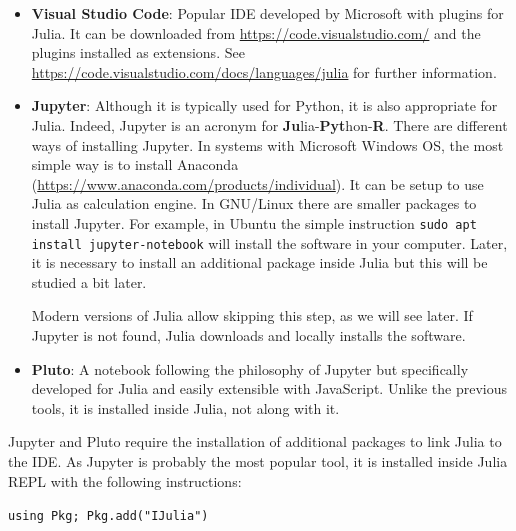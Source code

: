 \begin{itemize}
	\item \textbf{Visual Studio Code}: Popular IDE developed by Microsoft with plugins for Julia. It can be downloaded from \href{https://code.visualstudio.com/}{https://code.visualstudio.com/} and the plugins installed as extensions. See \href{https://code.visualstudio.com/docs/languages/julia}{https://code.visualstudio.com/docs/languages/julia} for further information.
	\item \textbf{Jupyter}: Although it is typically used for Python, it is also appropriate for Julia. Indeed, Jupyter is an acronym for \textbf{Ju}lia-\textbf{Pyt}hon-\textbf{R}. There are different ways of installing Jupyter. In systems with Microsoft Windows OS, the most simple way is to install Anaconda (\href{https://www.anaconda.com/products/individual}{https://www.anaconda.com/products/individual}). It can be setup to use Julia as calculation engine. In GNU/Linux there are smaller packages to install Jupyter. For example, in Ubuntu the simple instruction \texttt{sudo apt install jupyter-notebook} will install the software in your computer. Later, it is necessary to install an additional package inside Julia but this will be studied a bit later.
	
	Modern versions of Julia allow skipping this step, as we will see later. If Jupyter is not found, Julia  downloads and locally installs the software.
	\item \textbf{Pluto}: A notebook following the philosophy of Jupyter but specifically developed for Julia and easily extensible with JavaScript. Unlike the previous tools, it is installed inside Julia, not along with it. 
\end{itemize}
%
Jupyter and Pluto require the installation of additional packages to link Julia to the IDE. As Jupyter is probably the most popular tool, it is installed inside Julia REPL with the following instructions:

\vspace{1mm}
\begin{center}
	\texttt{using Pkg; Pkg.add("IJulia")}
\end{center}
\vspace{1mm}

